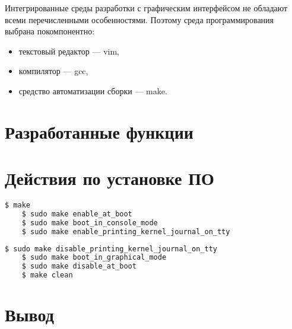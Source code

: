 Интегрированные среды разработки с графическим интерфейсом не обладают всеми перечисленными особенностями.
Поэтому среда программирования выбрана покомпонентно:
\begin{itemize}
	\item текстовый редактор — vim,
	\item компилятор — gcc,
	\item средство автоматизации сборки — make.
\end{itemize}

\section{Разработанные функции}

\section{Действия по установке ПО}

\begin{lstlisting}[gobble=8, language=Bash]
	$ make
	$ sudo make enable_at_boot
	$ sudo make boot_in_console_mode
	$ sudo make enable_printing_kernel_journal_on_tty
\end{lstlisting}

\begin{lstlisting}[gobble=8, language=Bash]
	$ sudo make disable_printing_kernel_journal_on_tty
	$ sudo make boot_in_graphical_mode
	$ sudo make disable_at_boot
	$ make clean
\end{lstlisting}

\section*{Вывод}
